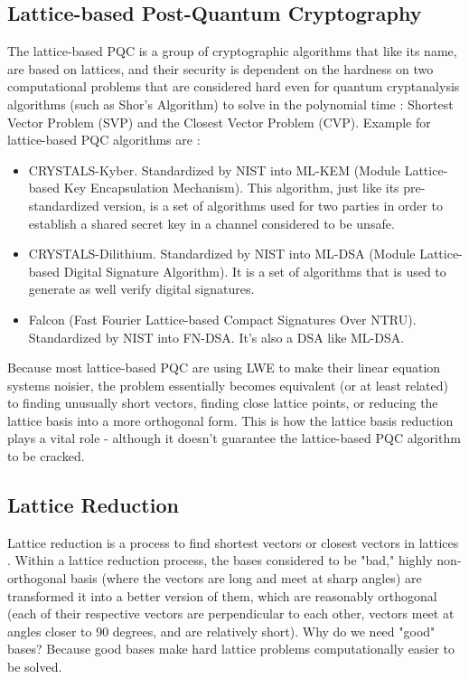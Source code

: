 \documentclass[runningheads]{llncs}
\begin{document}
\subsection{Lattice-based Post-Quantum Cryptography}
\mbox{}
The lattice-based PQC is a group of cryptographic algorithms that like its name, are based on lattices, and their security is dependent on the hardness on two computational problems that are considered hard even for quantum cryptanalysis algorithms (such as Shor's Algorithm) to solve in the polynomial time : Shortest Vector Problem (SVP) and the Closest Vector Problem (CVP). Example for lattice-based PQC algorithms are : 
\begin{itemize}
\raggedright
\item CRYSTALS-Kyber. Standardized by NIST into ML-KEM (Module Lattice-based Key Encapsulation Mechanism). This algorithm, just like its pre-standardized version, is a set of algorithms used for two parties in order to establish a shared secret key in a channel considered to be unsafe.
\item CRYSTALS-Dilithium. Standardized by NIST into ML-DSA (Module Lattice-based Digital Signature Algorithm). It is a set of algorithms that is used to generate as well verify digital signatures.
\item Falcon (Fast Fourier Lattice-based Compact Signatures Over NTRU). Standardized by NIST into FN-DSA. It's also a DSA like ML-DSA. 
\end{itemize}

Because most lattice-based PQC are using LWE to make their linear equation systems noisier, the problem essentially becomes equivalent (or at least related) to finding unusually short vectors, finding close lattice points, or reducing the lattice basis into a more orthogonal form. This is how the lattice basis reduction plays a vital role - although it doesn't guarantee the lattice-based PQC algorithm to be cracked. 

\subsection{Lattice Reduction}
\mbox{}

Lattice reduction is a process to find shortest vectors or closest vectors in lattices \cite{12}. Within a lattice reduction process, the bases considered to be "bad," highly non-orthogonal basis (where the vectors are long and meet at sharp angles) are transformed it into a better version of them, which are reasonably orthogonal (each of their respective vectors are perpendicular to each other, vectors meet at angles closer to 90 degrees, and are relatively short). Why do we need "good" bases? Because good bases make hard lattice problems computationally easier to be solved. 
\end{document}
